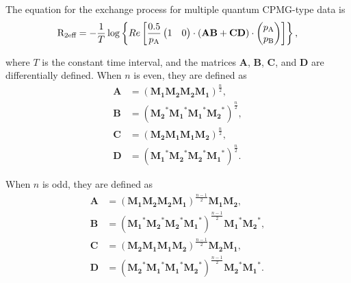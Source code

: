 The equation for the exchange process for multiple quantum CPMG-type data is 
\begin{equation}
    \mathrm{R}_\textrm{2eff} = - \frac{1}{T}
                 \log \left\{ Re \left[ \frac{0.5}{p_\textrm{A}}
                     \begin{pmatrix}1&0\end{pmatrix} \cdot \left( \mathbf{AB} + \mathbf{CD} \right) \cdot \begin{pmatrix}p_\textrm{A}\\p_\textrm{B}\end{pmatrix}
                 \right] \right\},
\end{equation}

where $T$ is the constant time interval, and the matrices $\mathbf{A}$, $\mathbf{B}$, $\mathbf{C}$, and $\mathbf{D}$ are differentially defined.
When $n$ is even, they are defined as 
\begin{subequations}
\begin{align}
    \mathbf{A} &= \left( \mathbf{M_1} \mathbf{M_2} \mathbf{M_2} \mathbf{M_1} \right)^{\frac{n}{2}}, \\
    \mathbf{B} &= \left( \mathbf{M_2}^* \mathbf{M_1}^* \mathbf{M_1}^* \mathbf{M_2}^* \right)^{\frac{n}{2}}, \\
    \mathbf{C} &= \left( \mathbf{M_2} \mathbf{M_1} \mathbf{M_1} \mathbf{M_2} \right)^{\frac{n}{2}}, \\
    \mathbf{D} &= \left( \mathbf{M_1}^* \mathbf{M_2}^* \mathbf{M_2}^* \mathbf{M_1}^* \right)^{\frac{n}{2}}.
\end{align}
\end{subequations}

When $n$ is odd, they are defined as
\begin{subequations}
\begin{align}
    \mathbf{A} &= \left( \mathbf{M_1} \mathbf{M_2} \mathbf{M_2} \mathbf{M_1} \right)^{\frac{n-1}{2}} \mathbf{M_1} \mathbf{M_2}, \\
    \mathbf{B} &= \left( \mathbf{M_1}^* \mathbf{M_2}^* \mathbf{M_2}^* \mathbf{M_1}^* \right)^{\frac{n-1}{2}} \mathbf{M_1}^* \mathbf{M_2}^*, \\
    \mathbf{C} &= \left( \mathbf{M_2} \mathbf{M_1} \mathbf{M_1} \mathbf{M_2} \right)^{\frac{n-1}{2}} \mathbf{M_2} \mathbf{M_1}, \\
    \mathbf{D} &= \left( \mathbf{M_2}^* \mathbf{M_1}^* \mathbf{M_1}^* \mathbf{M_2}^* \right)^{\frac{n-1}{2}} \mathbf{M_2}^* \mathbf{M_1}^*.
\end{align}
\end{subequations}

